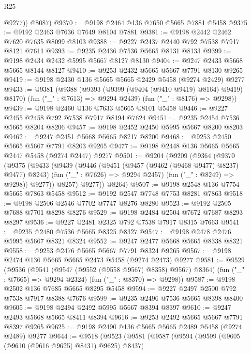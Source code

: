 \begin{lexlean}{R25}
\begin{coremodule}
          @9277))
      @8087)
@9370 := @9198 @2464 @136 @7650 @5665 @7881 @5458
@9375 := @9192 @2463 @7636 @7649 @8104 @7881
@9381 := @9198 @2442 @2462 @7620 @7635 @8099 @8103
@9388 := @9227 @2437 @2440 @792 @7538 @7917 @8121 @7611
@9393 := @9235 @2436 @7536 @5665 @8131 @8133
@9399 := @9198 @2434 @2432 @5995 @5667 @8127 @8130
@9404 := @9247 @2433 @5668 @5665 @8144 @8127
@9410 := @9253 @2432 @5665 @5667 @7791 @8130 @9265
@9419 := @9198 @2430 @136 @5665 @5665 @2429 @5458 (@9274 @2429) @9277
@9433 := @9381
    (@9388
      (@9393 (@9399 (@9404 (@9410 @9419) @8164) @9419) @8170)
      (fun ("_" : @7613) => @9294 @2439)
      (fun ("_" : @8176) => @9298))
@9439 := @9198 @2460 @136 @7633 @5665 @8101 @5458
@9446 := @9227 @2455 @2458 @792 @7538 @7917 @8194 @7624
@9451 := @9235 @2454 @7536 @5665 @8204 @8206
@9457 := @9198 @2452 @2450 @5995 @5667 @8200 @8203
@9462 := @9247 @2451 @5668 @5665 @8217 @8200
@9468 := @9253 @2450 @5665 @5667 @7791 @8203 @9265
@9477 := @9198 @2448 @136 @5665 @5665 @2447 @5458 (@9274 @2447) @9277
@9501 := @9204
    (@9209
      (@9364
        (@9370
          (@9375
            (@9433
              (@9439
                (@9446
                  (@9451 (@9457 (@9462 (@9468 @9477) @8237) @9477) @8243)
                  (fun ("_" : @7626) => @9294 @2457)
                  (fun ("_" : @8249) => @9298))
                @9277))
            @8257)
          @9277))
      @8264)
@9507 := @9198 @2548 @136 @7754 @5665 @7863 @5458
@9512 := @9192 @2547 @7748 @7753 @8281 @7863
@9518 := @9198 @2506 @2546 @7702 @7747 @8276 @8280
@9523 := @9192 @2505 @7688 @7701 @8298 @8276
@9529 := @9198 @2484 @2504 @7672 @7687 @8293 @8297
@9536 := @9227 @2481 @2325 @792 @7538 @7917 @8315 @7663
@9541 := @9235 @2480 @7536 @5665 @8325 @8327
@9547 := @9198 @2478 @2476 @5995 @5667 @8321 @8324
@9552 := @9247 @2477 @5668 @5665 @8338 @8321
@9558 := @9253 @2476 @5665 @5667 @7791 @8324 @9265
@9567 := @9198 @2474 @136 @5665 @5665 @2473 @5458 (@9274 @2473) @9277
@9581 := @9529
    (@9536
      (@9541 (@9547 (@9552 (@9558 @9567) @8358) @9567) @8364)
      (fun ("_" : @7665) => @9294 @2324)
      (fun ("_" : @8370) => @9298))
@9587 := @9198 @2502 @136 @7685 @5665 @8295 @5458
@9594 := @9227 @2497 @2500 @792 @7538 @7917 @8388 @7676
@9599 := @9235 @2496 @7536 @5665 @8398 @8400
@9605 := @9198 @2494 @2492 @5995 @5667 @8394 @8397
@9610 := @9247 @2493 @5668 @5665 @8411 @8394
@9616 := @9253 @2492 @5665 @5667 @7791 @8397 @9265
@9625 := @9198 @2490 @136 @5665 @5665 @2489 @5458 (@9274 @2489) @9277
@9644 := @9518
    (@9523
      (@9581
        (@9587
          (@9594
            (@9599 (@9605 (@9610 (@9616 @9625) @8431) @9625) @8437)

\end{coremodule}
\end{lexlean}
